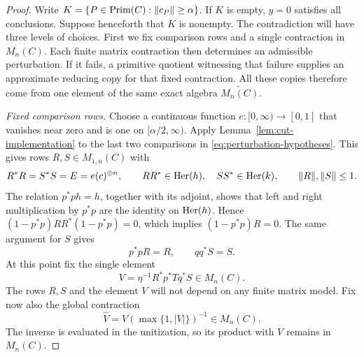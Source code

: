 \begin{proof}
Write \(K=\{P\in\operatorname{Prim}(C):\|c_P\|\geq\alpha\}\).  If \(K\) is
empty, \(y=0\) satisfies all conclusions.  Suppose henceforth that
\(K\) is nonempty.  The contradiction will have three levels of choices.
First we fix comparison rows and a single contraction in \(M_n(C)\).  Each finite matrix contraction then determines an
admissible perturbation.  If it fails, a primitive quotient witnessing
that failure supplies an approximate reducing copy for that fixed
contraction.  All these copies therefore come from one element
of the same exact algebra \(\widetilde{M_n(C)}\).

\smallskip
\noindent\emph{Fixed comparison rows.}
Choose a continuous function \(e\colon[0,\infty)\to[0,1]\) that
vanishes near zero and is one on \([\alpha/2,\infty)\).
Apply Lemma~\ref{lem:cut-implementation} to the last two comparisons
in \eqref{eq:perturbation-hypotheses}.  This gives rows
\(R,S\in M_{1,n}(C)\) with
\begin{equation}
 R^*R=S^*S=E=e(c)^{\oplus n},\qquad
 RR^*\in\operatorname{Her}(h),\quad SS^*\in\operatorname{Her}(k),\qquad
 \|R\|,\|S\|\leq1.
 \label{eq:perturbation-rows}
\end{equation}
The relation \(p^*ph=h\), together with its adjoint, shows that
left and right multiplication by \(p^*p\) are the identity on
\(\operatorname{Her}(h)\).  Hence
\((1-p^*p)RR^*(1-p^*p)=0\), which implies
\((1-p^*p)R=0\).  The same argument for \(S\) gives
\begin{equation}
 p^*pR=R,\qquad qq^*S=S.
 \label{eq:perturbation-row-identities}
\end{equation}
At this point fix the single element
\begin{equation}
 V=\eta^{-1}R^*p^*Tq^*S\in M_n(C).
 \label{eq:fixed-testing-element}
\end{equation}
The rows \(R,S\) and the element \(V\) will not depend on any finite
matrix model.  Fix now also the global contraction
\[
 \widehat V=V(\max\{1,|V|\})^{-1}\in M_n(C).
\]
The inverse is evaluated in the unitization, so its product with
\(V\) remains in \(M_n(C)\).


\end{proof}
